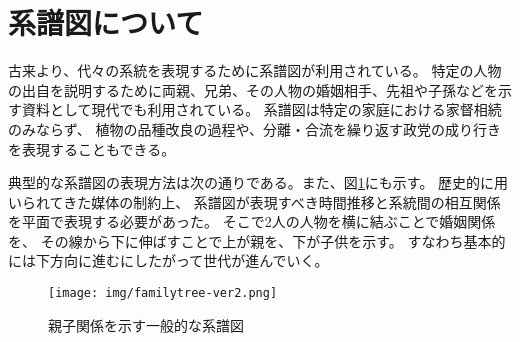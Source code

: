 \section{系譜図について}
\label{tag:tree}
古来より、代々の系統を表現するために系譜図が利用されている。
特定の人物の出自を説明するために両親、兄弟、その人物の婚姻相手、先祖や子孫などを示す資料として現代でも利用されている。
系譜図は特定の家庭における家督相続のみならず、
植物の品種改良の過程や、分離・合流を繰り返す政党の成り行きを表現することもできる。

典型的な系譜図の表現方法は次の通りである。また、図\ref{fig:familytree}にも示す。
歴史的に用いられてきた媒体の制約上、
系譜図が表現すべき時間推移と系統間の相互関係を平面で表現する必要があった。
そこで2人の人物を横に結ぶことで婚姻関係を、
その線から下に伸ばすことで上が親を、下が子供を示す。
すなわち基本的には下方向に進むにしたがって世代が進んでいく。

\begin{figure}[htbp]
    \begin{center}
      \texttt{[image: img/familytree-ver2.png]}
    \end{center}
    \caption{親子関係を示す一般的な系譜図}
    \label{fig:familytree}
\end{figure}